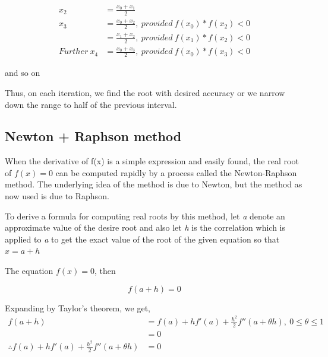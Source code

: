 \documentclass[11pt, a4paper, oneside]{book}
\begin{document}
            \begin{align*}
              x_2&=\frac{x_0+x_1}{2}\\
              x_3&=\frac{x_0+x_2}{2},\ provided\ f(x_0)*f(x_2)<0\\
              &=\frac{x_1+x_2}{2},\ provided\ f(x_1)*f(x_2)<0\\
              Further\ x_4&=\frac{x_0+x_3}{2},\ provided\ f(x_0)*f(x_3)<0
            \end{align*}

            and so on

            Thus, on each iteration, we find the root with desired accuracy or we narrow down
            the range to half of the previous interval.


          \subsection{Newton + Raphson method}
            When the derivative of f(x) is a simple expression and easily found, the real root
            of $f(x)=0$ can be computed rapidly by a process called the Newton-Raphson method.
            The underlying idea of the method is due to Newton, but the method as now used is
            due to Raphson.

            To derive a formula for computing real roots by this method, let \textit{a} denote
            an approximate value of the desire root and also let \textit{h} is the correlation
            which is applied to \textit{a} to get the exact value of the root of the given
            equation so that $x=a+h$

            The equation $f(x)=0$, then

            \begin{equation*}
              f(a+h)=0
            \end{equation*}

            Expanding by Taylor's theorem, we get,
            \begin{align*}
                                                           f(a+h) &= f(a)+hf'(a)+
                                                                     \frac{h^2}{2}f''(a+\theta h),\
                                                                     0\le \theta \le 1\\
                                                                  &= 0\\
              \therefore f(a)+hf'(a)+\frac{h^2}{2}f''(a+\theta h) &= 0
            \end{align*}
\end{document}
